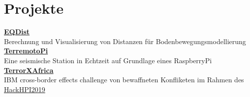\documentclass{article}
\begin{document}
\begin{minipage}[t]{0.70\textwidth}
		\section*{\fontsize{18pt}{24pt}\selectfont \color{pblue} Projekte}
		\textbf{\color{pblue}\href{https://earthquake-distances.herokuapp.com}{EQDist}}\\ {Berechnung und Visualisierung von Distanzen für Bodenbewegungsmodellierung} \vspace{1mm} \\
		\textbf{\color{pblue}\href{https://silvioschwarz.github.io/TerremotoPi/}{TerremotoPi}}\\ {Eine seismische Station in Echtzeit auf Grundlage eines RaspberryPi } \vspace{1mm}\\
		\textbf{\color{pblue}\href{https://terrorxafrica.herokuapp.com}{TerrorXAfrica}}\\ {IBM cross-border effects challenge von bewaffneten Konfliketen im Rahmen des \href{https://hackhpi2019.devpost.com}{\color{pblue}HackHPI2019} }


\end{minipage}
\end{document}
